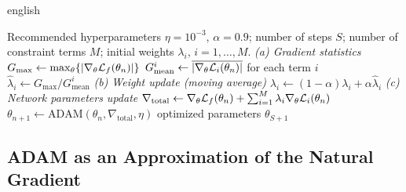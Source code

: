 \documentclass[../0000.tex]{subfiles}
\begin{document}
\begin{hyphenrules}{english}
\begin{algorithm}[htbp]
  \caption{Learning rate annealing with ADAM.}
  \label{alg:lra}
  \begin{algorithmic}[1]
    \Require Recommended hyperparameters $\eta=10^{-3}$, $\alpha=0.9$; number of steps $S$; number of
      constraint terms $M$; initial weights $\lambda_i$, $i=1,\dots,M$.
      \State \textit{(a) Gradient statistics}
      \State $G_{\max}\gets\max_\theta\{\left\lvert \nabla_\theta\mathcal{L}_f(\theta_n) \right\rvert\}$ 
      \State $G^{i}_{\mathrm{mean}}\gets\overline{\left\lvert \nabla_\theta\mathcal{L}_i(\theta_n) \right\rvert}$ for each term $i$
      \State $\hat\lambda_i\gets G_{\max}/G^{i}_{\mathrm{mean}}$ 
      \State \textit{(b) Weight update (moving average)}
      \State $\lambda_i\gets(1-\alpha)\lambda_i+\alpha\hat\lambda_i$ 
      \State \textit{(c) Network parameters update}
      \State $\nabla_{\mathrm{total}}\gets\nabla_\theta\mathcal{L}_f(\theta_n)+\sum_{i=1}^{M}\lambda_i\nabla_\theta\mathcal{L}_i(\theta_n)$
      \State $\theta_{n+1}\gets\mathrm{ADAM}(\theta_n,\nabla_{\mathrm{total}},\eta)$ 
    \EndFor
    \State \Return optimized parameters $\theta_{S+1}$
  \end{algorithmic}
\end{algorithm}

\subsection{ADAM as an Approximation of the Natural Gradient}


\end{hyphenrules}
\end{document}
